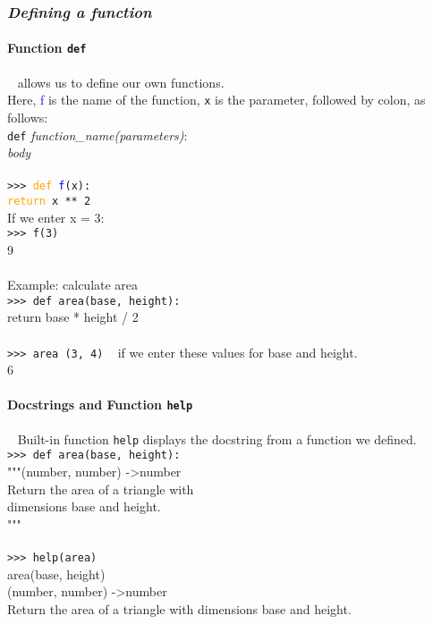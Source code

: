 \documentclass{article}
\begin{document}
{{{\subsubsection{\small\textsl{Defining a function}}
\paragraph{Function \texttt{def}} ~ allows us to define our own functions.\\
Here, \textcolor{blue}{f} is the name of the function, \texttt{x} is the parameter, followed by colon, as follows:\\
\texttt{def} \textit{function\_name(parameters)}: \\
\indent \textit{body}\\
\\
\texttt{>>> \textcolor{orange}{def} \textcolor{blue}{f}(x):}\\
\indent \indent \indent \texttt{\textcolor{orange}{return} x ** 2}\\
If we enter x = 3:\\
\texttt{>>> f(3)} \\
9 \\
\\
Example: calculate area\\
\texttt{>>> def area(base, height):}\\
\indent \indent \indent return base * height / 2\\
\\
\texttt{>>> area (3, 4)} ~ if we enter these values for base and height.\\
6
\paragraph{Docstrings and Function \texttt{help}} ~ Built-in function \texttt{help} displays the docstring from a function we defined. \\
\texttt{>>> def area(base, height):}\\
\indent \indent \indent """(number, number) -\textgreater  number \\
\indent \indent \indent Return the area of a triangle with\\ \indent \indent \indent dimensions base and height.\\
\indent \indent \indent """ \\
\\
\texttt{>>> help(area)}\\
area(base, height)\\
\indent (number, number) -\textgreater  number\\
\indent Return the area of a triangle with dimensions base and height.


}}}
\end{document}
